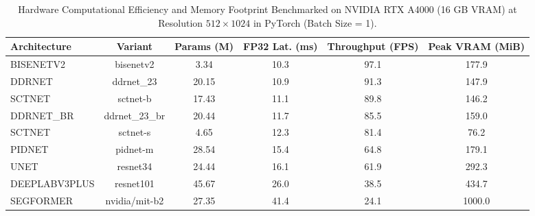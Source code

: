 \begin{table}[t]
\centering
\caption{Hardware Computational Efficiency and Memory Footprint Benchmarked on NVIDIA RTX A4000 (16 GB VRAM) at Resolution $512 \times 1024$ in PyTorch (Batch Size = 1).}
\label{tab:efficiency}
\begin{tabular}{lccccc}
\toprule
\textbf{Architecture} & \textbf{Variant} & \textbf{Params (M)} & \textbf{FP32 Lat. (ms)} & \textbf{Throughput (FPS)} & \textbf{Peak VRAM (MiB)} \\
\midrule
BISENETV2 & bisenetv2 & 3.34 & 10.3 & 97.1 & 177.9 \\
DDRNET & ddrnet_23 & 20.15 & 10.9 & 91.3 & 147.9 \\
SCTNET & sctnet-b & 17.43 & 11.1 & 89.8 & 146.2 \\
DDRNET_BR & ddrnet_23_br & 20.44 & 11.7 & 85.5 & 159.0 \\
SCTNET & sctnet-s & 4.65 & 12.3 & 81.4 & 76.2 \\
PIDNET & pidnet-m & 28.54 & 15.4 & 64.8 & 179.1 \\
UNET & resnet34 & 24.44 & 16.1 & 61.9 & 292.3 \\
DEEPLABV3PLUS & resnet101 & 45.67 & 26.0 & 38.5 & 434.7 \\
SEGFORMER & nvidia/mit-b2 & 27.35 & 41.4 & 24.1 & 1000.0 \\
\bottomrule
\end{tabular}
\end{table}